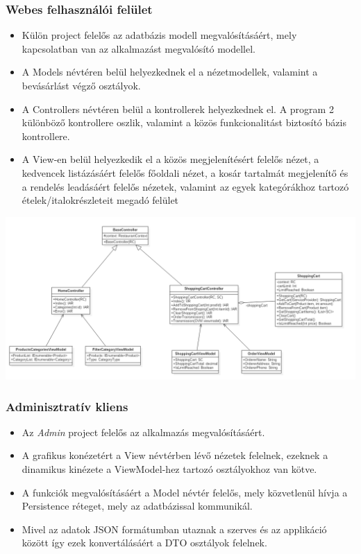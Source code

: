 \documentclass[12pt,a4paper]{article}
\begin{document}
\subsubsection{Webes felhasználói felület}
\begin{itemize}
\item Külön project felelős az adatbázis modell megvalósításáért, mely kapcsolatban van az alkalmazást megvalósító modellel. 
\item A Models névtéren belül helyezkednek el a nézetmodellek,  valamint a bevásárlást végző osztályok.
\item A Controllers névtéren belül a kontrollerek helyezkednek el. A program 2 különböző kontrollere oszlik, valamint a közös funkcionalitást biztosító bázis kontrollere.
\item A View-en belül helyezkedik el a közös megjelenítésért felelős nézet, a kedvencek listázásáért felelős főoldali nézet,  a kosár tartalmát megjelenítő és a rendelés leadásáért felelős nézetek, valamint az egyek kategórákhoz tartozó ételek/italokrészleteit megadó felület
\end{itemize}

\begin{center}
\includegraphics[scale=0.4]{classdiagram}
\end{center}

\subsubsection{Adminisztratív kliens}
\begin{itemize}
\item Az \textit{Admin} project felelős az alkalmazás megvalósításáért.
\item A grafikus konézetért a View névtérben lévő nézetek felelnek, ezeknek a dinamikus kinézete a ViewModel-hez tartozó osztályokhoz van kötve.
\item A funkciók megvalósításáért a Model névtér felelős, mely közvetlenül hívja a Persistence réteget, mely az adatbázissal kommunikál.  
\item Mivel az adatok JSON formátumban utaznak a szerves és az applikáció között így ezek konvertálásáért a DTO osztályok felelnek.
\end{itemize}
\end{document}
